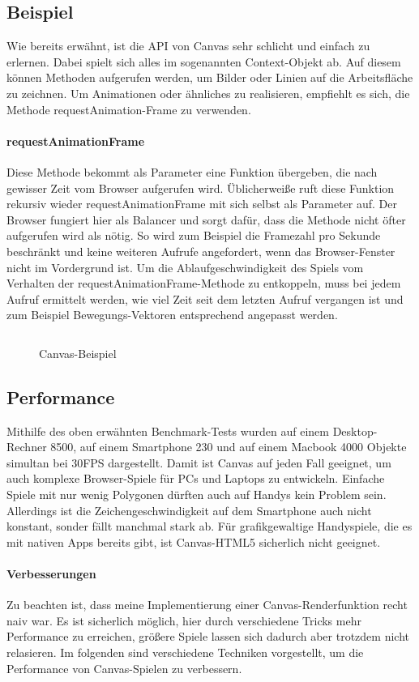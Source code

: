 \documentclass[a4paper, 12pt]{article}
\begin{document}
\subsection{Beispiel}
Wie bereits erwähnt, ist die API von Canvas sehr schlicht und einfach zu erlernen. Dabei spielt sich alles im sogenannten Context-Objekt ab. Auf diesem können Methoden aufgerufen werden, um Bilder oder Linien auf  die Arbeitsfläche zu zeichnen. Um Animationen oder ähnliches zu realisieren, empfiehlt es sich, die Methode requestAnimation-Frame zu verwenden.
\paragraph{requestAnimationFrame} Diese Methode bekommt als Parameter eine Funktion übergeben, die nach gewisser Zeit vom Browser aufgerufen wird. Üblicherweiße ruft diese Funktion rekursiv wieder requestAnimationFrame mit sich selbst als Parameter auf. Der Browser fungiert hier als Balancer und sorgt dafür, dass die Methode nicht öfter aufgerufen wird als nötig. So wird zum Beispiel die Framezahl pro Sekunde beschränkt und keine weiteren Aufrufe angefordert, wenn das Browser-Fenster nicht im Vordergrund ist. Um die Ablaufgeschwindigkeit des Spiels vom Verhalten der requestAnimationFrame-Methode zu entkoppeln, muss bei jedem Aufruf ermittelt werden, wie viel Zeit seit dem letzten Aufruf vergangen ist und zum Beispiel Bewegungs-Vektoren entsprechend angepasst werden.
\begin{figure}[h!]
	\inputminted{javascript}{assets/vanillacanvas_example.js}
	\caption{Canvas-Beispiel}
	\label{canvas_support2}
\end{figure}
\subsection{Performance}
Mithilfe des oben erwähnten Benchmark-Tests wurden auf einem Desktop-Rechner 8500, auf einem Smartphone 230 und auf einem Macbook 4000 Objekte simultan bei 30FPS dargestellt. Damit ist Canvas auf jeden Fall geeignet, um auch komplexe Browser-Spiele für PCs und Laptops zu entwickeln. Einfache Spiele mit nur wenig Polygonen dürften auch auf Handys kein Problem sein. Allerdings ist die Zeichengeschwindigkeit auf dem Smartphone auch nicht konstant, sonder fällt manchmal stark ab. Für grafikgewaltige Handyspiele, die es mit nativen Apps bereits gibt, ist Canvas-HTML5 sicherlich nicht geeignet.
\paragraph{Verbesserungen} Zu beachten ist, dass meine Implementierung einer Canvas-Renderfunktion recht naiv war. Es ist sicherlich möglich, hier durch verschiedene Tricks mehr Performance zu erreichen, größere Spiele lassen sich dadurch aber trotzdem nicht relasieren. Im folgenden sind verschiedene Techniken vorgestellt, um die Performance von Canvas-Spielen zu verbessern.
\end{document}
